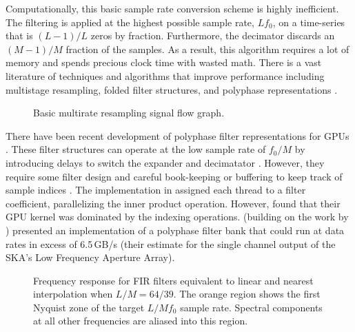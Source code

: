 Computationally, this basic sample rate conversion scheme is highly inefficient.  The filtering is applied at 
the highest possible sample rate, $Lf_0$, on a time-series that is $(L-1)/L$ zeros by fraction. Furthermore, the 
decimator discards an $(M-1)/M$ fraction of the samples.  As a result, this algorithm requires a lot of memory 
and spends precious clock time with wasted math.  There is a vast literature of techniques and algorithms that 
improve performance including multistage resampling, folded filter structures, and polyphase representations 
\citep{oppenheim10,lyons11,vaidyanathan93}.

\begin{figure}[t]
\centering
{}
\caption{Basic multirate resampling signal flow graph.}
\label{fig:resample_basic}
\end{figure}

There have been recent development of polyphase filter representations for GPUs
\citep[i.e.][]{vanderveldt12,adamek14,kim14a}.  These filter structures can operate at the low sample rate of 
$f_0/M$
by introducing delays to switch the expander and decimatator \citep{crochiere81}.  However, they require 
some filter design and careful book-keeping or buffering to keep track of sample indices \citep{wang01}.
The implementation in \citet{kim14a} assigned each thread to a filter coefficient, parallelizing the 
inner product operation.  However, \citet{kim14a} found that their GPU kernel was dominated by the 
indexing operations.  \citet{adamek14} (building on the work by \citet{vanderveldt12}) presented an
implementation of a polyphase filter bank that could run at data rates in excess of 6.5\,GB/s 
(their estimate for the single channel output of the SKA's Low Frequency Aperture Array).

\begin{figure}[t!]
\caption{Frequency response for FIR filters equivalent to linear and nearest interpolation when $L/M = 64/39$.
The orange region shows the first Nyquist zone of the target $L/Mf_0$ sample rate.  Spectral components at all 
other frequencies are aliased into this region.}
\label{fig:windows}
\end{figure}

